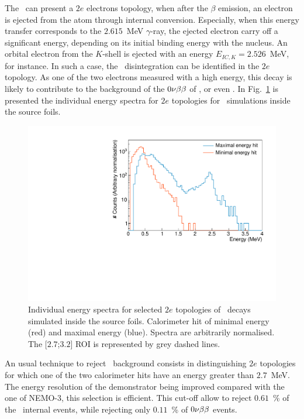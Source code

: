 The \Tl\ can present a $2e$ electrons topology, when after the $\beta$ emission, an electron is ejected from the atom through internal conversion.
Especially, when this energy transfer corresponds to the $2.615$~MeV $\gamma$-ray, the ejected electron carry off a significant energy, depending on its initial binding energy with the nucleus.
An orbital electron from the $K$-shell is ejected with an energy $E_{IC,K}=2.526$~MeV, for instance.
In such a case, the \Tl\ disintegration can be identified in the $2e$ topology.
As one of the two electrons measured with a high energy, this decay is likely to contribute to the background of the $0\nu\beta\beta$ of \Se, or even \Nd.
In Fig.~\ref{fig:Emin_Emax_Tl} is presented the individual energy spectra for $2e$ topologies for \Tl\ simulations inside the source foils.
\begin{figure}
  \centering
  \includegraphics[width=13cm]{timedifference/fig_timediff/energy_spect_min_max_208Tl.pdf}
  \caption{Individual energy spectra for selected $2e$ topologies of \Tl\ decays simulated inside the source foils.
    Calorimeter hit of minimal energy (red) and maximal energy (blue).
    Spectra are arbitrarily normalised.
    The [$2.7$;$3.2$] ROI is represented by grey dashed lines.
    \label{fig:Emin_Emax_Tl}}
\end{figure}
An usual technique to reject \Tl\ background consists in distinguishing $2e$ topologies for which one of the two calorimeter hits have an energy greater than $2.7$~MeV.
The energy resolution of the demonstrator being improved compared with the one of NEMO-$3$, this selection is efficient.
This cut-off allow to reject $0.61$~\% of the \Tl\ internal events, while rejecting only $0.11$~\% of $0\nu\beta\beta$ events.

